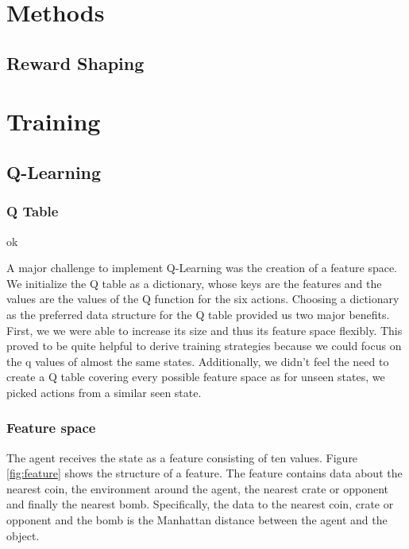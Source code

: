 \documentclass[
	letterpaper, %
	12pt, %
]{CSUniSchoolLabReport}
\begin{document}
\section{Methods}

\subsection{Reward Shaping}


\section{Training}
\subsection{Q-Learning}

\subsubsection*{Q Table}

ok \cite{DynRewardShaping}

A major challenge to implement Q-Learning was the creation of a feature space.
We initialize the Q table as a dictionary, whose keys are the features and the values are the values of the Q function for the six
actions.
Choosing a dictionary as the preferred data structure for the Q table provided us
two major benefits.
First, we we were able to increase its size and thus its feature space flexibly.
This proved to be quite helpful to derive training strategies because we
could focus on the q values of almost the same states.
Additionally, we didn't feel the need to create a Q table covering every possible
feature space as for unseen states, we picked actions from a similar seen state.

\subsubsection*{Feature space}
The agent receives the state as a feature consisting of ten values. Figure \ref{fig:feature} shows
the structure of a feature. The feature contains data about the nearest coin, the environment around
the agent, the nearest crate or opponent and finally the nearest bomb.
Specifically, the data to the nearest coin, crate or opponent and the bomb is the Manhattan distance
between the agent and the object.
\end{document}
